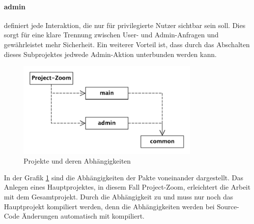 \paragraph{admin} definiert jede Interaktion, die nur 
für privilegierte Nutzer sichtbar sein soll. Dies sorgt für eine klare Trennung zwischen User- und Admin-Anfragen und gewährleistet mehr Sicherheit. Ein weiterer Vorteil ist, dass durch das Abschalten dieses Subprojektes jedwede Admin-Aktion unterbunden werden kann.

\begin{figure}[h]  
  \centering     
  \includegraphics[width=0.8\textwidth]{img/projekte.pdf}  
   \caption{Projekte und deren Abhängigkeiten}   
  \label{fig:projects} 
\end{figure}

\FloatBarrier
In der Grafik \ref{fig:projects} sind die Abhängigkeiten der Pakte voneinander dargestellt. Das Anlegen eines Hauptprojektes, in diesem Fall Project-Zoom, erleichtert die Arbeit mit dem Gesamtprojekt. Durch die Abhängigkeit zu  und  muss nur noch das Hauptprojekt kompiliert werden, denn die Abhängigkeiten werden bei Source-Code Änderungen automatisch mit kompiliert.

